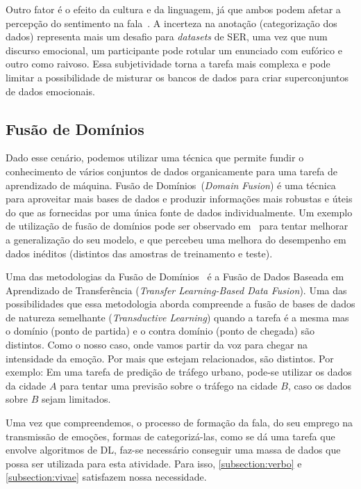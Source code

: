 Outro fator é o efeito da cultura e da linguagem, já que ambos podem afetar a percepção do sentimento na fala~\cite{32}. A incerteza na anotação (categorização dos dados) representa mais um desafio para \textit{datasets} de \acrshort{SER}, uma vez que num discurso emocional, um participante pode rotular um enunciado com eufórico e outro como raivoso. Essa subjetividade torna a tarefa mais complexa e pode limitar a possibilidade de misturar os bancos de dados para criar superconjuntos de dados emocionais.

\subsection{Fusão de Domínios}

Dado esse cenário, podemos utilizar uma técnica que permite fundir o conhecimento de vários conjuntos de dados organicamente para uma tarefa de aprendizado de máquina. Fusão de Domínios~\cite{49}(\textit{Domain Fusion}) é uma técnica para aproveitar mais bases de dados e produzir informações mais robustas e úteis do que as fornecidas por uma única fonte de dados individualmente. Um exemplo de utilização de fusão de domínios pode ser observado em~\cite{3} para tentar melhorar a generalização do seu modelo, e que percebeu uma melhora do desempenho em dados inéditos (distintos das amostras de treinamento e teste).

Uma das metodologias da Fusão de Domínios~\cite{49} é a Fusão de Dados Baseada em Aprendizado de Transferência (\textit{Transfer Learning-Based Data Fusion}). Uma das possibilidades que essa metodologia aborda compreende a fusão de bases de dados de natureza semelhante (\textit{Transductive Learning}) quando a tarefa é a mesma mas o domínio (ponto de partida) e o contra domínio (ponto de chegada) são distintos. Como o nosso caso, onde vamos partir da voz para chegar na intensidade da emoção. Por mais que estejam relacionados, são distintos. Por exemplo: Em uma tarefa de predição de tráfego urbano, pode-se utilizar os dados da cidade $A$ para tentar uma previsão sobre o tráfego na cidade $B$, caso os dados sobre $B$ sejam limitados. 

Uma vez que compreendemos, o processo de formação da fala, do seu emprego na transmissão de emoções, formas de categorizá-las, como se dá uma tarefa que envolve algoritmos de \acrshort{DL}, faz-se necessário conseguir uma massa de dados que possa ser utilizada para esta atividade. Para isso, \ref{subsection:verbo} e \ref{subsection:vivae} satisfazem nossa necessidade.

